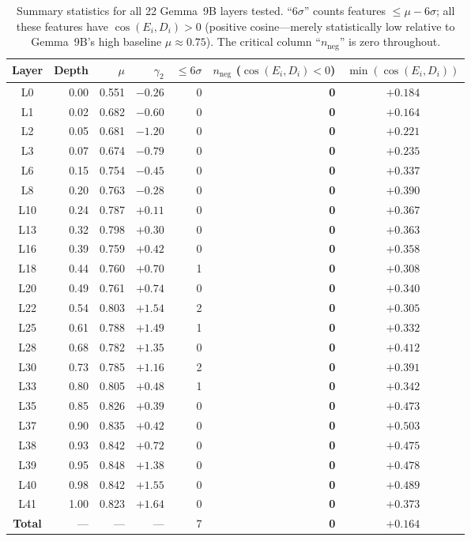 \documentclass[11pt,a4paper]{article}
\newcommand{\cosED}{\cos(E_i, D_i)}
\begin{document}
\begin{table}[H]
\centering
\caption{Summary statistics for all 22 Gemma~9B layers tested. ``6$\sigma$'' counts features $\leq\mu-6\sigma$; all these features have $\cosED > 0$ (positive cosine---merely statistically low relative to Gemma~9B's high baseline $\mu \approx 0.75$). The critical column ``$n_\text{neg}$'' is zero throughout.}
\label{tab:gemma9b_full}
\small
\setlength{\tabcolsep}{4pt}
\begin{tabular}{@{}crrrrrc@{}}
\toprule
Layer & Depth & $\mu$ & $\gamma_2$ & $\leq6\sigma$ & $n_\text{neg}$ ($\cosED{<}0$) & $\min(\cosED)$ \\
\midrule
L0  & 0.00 & 0.551 & $-0.26$ & 0 & \textbf{0} & $+0.184$ \\
L1  & 0.02 & 0.682 & $-0.60$ & 0 & \textbf{0} & $+0.164$ \\
L2  & 0.05 & 0.681 & $-1.20$ & 0 & \textbf{0} & $+0.221$ \\
L3  & 0.07 & 0.674 & $-0.79$ & 0 & \textbf{0} & $+0.235$ \\
L6  & 0.15 & 0.754 & $-0.45$ & 0 & \textbf{0} & $+0.337$ \\
L8  & 0.20 & 0.763 & $-0.28$ & 0 & \textbf{0} & $+0.390$ \\
L10 & 0.24 & 0.787 & $+0.11$ & 0 & \textbf{0} & $+0.367$ \\
L13 & 0.32 & 0.798 & $+0.30$ & 0 & \textbf{0} & $+0.363$ \\
L16 & 0.39 & 0.759 & $+0.42$ & 0 & \textbf{0} & $+0.358$ \\
L18 & 0.44 & 0.760 & $+0.70$ & 1 & \textbf{0} & $+0.308$ \\
L20 & 0.49 & 0.761 & $+0.74$ & 0 & \textbf{0} & $+0.340$ \\
L22 & 0.54 & 0.803 & $+1.54$ & 2 & \textbf{0} & $+0.305$ \\
L25 & 0.61 & 0.788 & $+1.49$ & 1 & \textbf{0} & $+0.332$ \\
L28 & 0.68 & 0.782 & $+1.35$ & 0 & \textbf{0} & $+0.412$ \\
L30 & 0.73 & 0.785 & $+1.16$ & 2 & \textbf{0} & $+0.391$ \\
L33 & 0.80 & 0.805 & $+0.48$ & 1 & \textbf{0} & $+0.342$ \\
L35 & 0.85 & 0.826 & $+0.39$ & 0 & \textbf{0} & $+0.473$ \\
L37 & 0.90 & 0.835 & $+0.42$ & 0 & \textbf{0} & $+0.503$ \\
L38 & 0.93 & 0.842 & $+0.72$ & 0 & \textbf{0} & $+0.475$ \\
L39 & 0.95 & 0.848 & $+1.38$ & 0 & \textbf{0} & $+0.478$ \\
L40 & 0.98 & 0.842 & $+1.55$ & 0 & \textbf{0} & $+0.489$ \\
L41 & 1.00 & 0.823 & $+1.64$ & 0 & \textbf{0} & $+0.373$ \\
\midrule
\textbf{Total} & --- & --- & --- & 7 & \textbf{0} & $+0.164$ \\
\bottomrule
\end{tabular}
\end{table}
\end{document}
